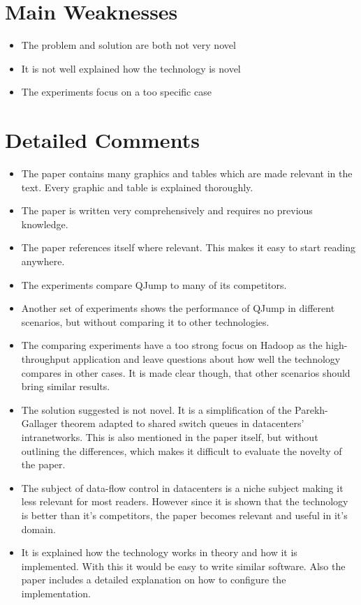 \documentclass[a4paper]{article}
\begin{document}
\setcounter{secnumdepth}{0}
\section{Main Weaknesses}
\begin{itemize}
	\setlength{\itemsep}{-4pt}
	\item The problem and solution are both not very novel
	\item It is not well explained how the technology is novel
	\item The experiments focus on a too specific case
\end{itemize}

\newpage
\setcounter{secnumdepth}{0}
\section{Detailed Comments}
\begin{itemize}
	\setlength{\itemsep}{-4pt}
	\item The paper contains many graphics and tables which are made relevant in the text. Every graphic 
	and table is explained thoroughly.
	\item The paper is written very comprehensively and requires no previous knowledge.
	\item The paper references itself where relevant. This makes it easy to start reading 
	anywhere.
	\item The experiments compare QJump to many of its competitors. 
	\item Another set of experiments shows the performance of QJump in different scenarios, but without 
	comparing it to other technologies.
	\item The comparing experiments have a too strong focus on Hadoop as the high-throughput application 
	and leave questions about how well the technology compares in other cases. It is made clear though, 
	that other scenarios should bring similar results.
	\item The solution suggested is not novel. It is a simplification of the Parekh-Gallager theorem  
	adapted to shared switch queues in datacenters' intranetworks. This is also mentioned in the 
	paper itself, but without outlining the differences, which makes it difficult to evaluate the 
	novelty of the paper.
	\item The subject of data-flow control in datacenters is a niche subject making it less 
	relevant for most readers. However since it is shown that the technology is better than it's 
	competitors, the paper becomes relevant and useful in it's domain.
	\item It is explained how the technology works in theory and how it is implemented. With this it 
	would be easy to write similar software. Also the paper includes a detailed explanation on how 
	to configure the implementation.
\end{itemize}
\end{document}
